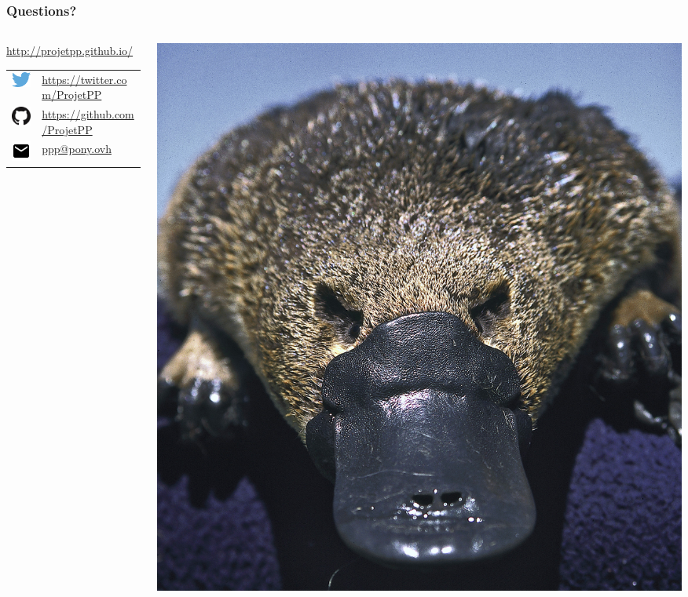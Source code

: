 \newlength{\logosize}
\setlength{\logosize}{12pt}
\begin{frame}
    \frametitle{Questions?}
    
    \begin{columns}
    \begin{column}{0.55\textwidth}
        \alert{\url{http://projetpp.github.io/}}\vspace{5pt}
        \begin{tabular}{ll}
            \includegraphics[width=\logosize]{Twitter_logo_blue.png} & \href{https://twitter.com/ProjetPP}{https://twitter.com/ProjetPP}\\
            \includegraphics[width=\logosize]{GitHub-Mark-32px.png} &  \href{https://github.com/ProjetPP}{https://github.com/ProjetPP}\\
            \includegraphics[width=\logosize]{ic_email_black_18dp.png} & \href{mailto:ppp@pony.ovh}{ppp@pony.ovh}\\
        \end{tabular}
    \end{column}
    \begin{column}{0.5\textwidth}
        \includegraphics[width=\linewidth]{figures/Ornithorhynchus.jpg}
    \end{column}
    \end{columns}
\end{frame}

